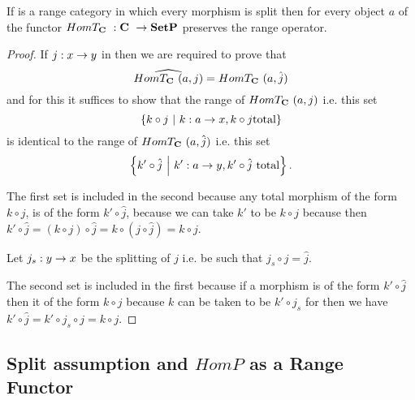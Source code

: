 \documentclass[10pt,a4paper]{article}
\theoremstyle{remark}
\begin{document}
\begin{lemma}
If \catcw is a range category in which every morphism is split then
for every object $a$ of \catcw the functor $HomT_{\textbf{C}}\ : \textbf{C}\  \rightarrow \textbf{SetP}$ preserves the range operator.
\end{lemma}
\begin{proof}
If $j: x \rightarrow y$ in \catcw then we are required to prove that
$$\widehat{HomT_{\textbf{C}}\ (a,j)}=HomT_{\textbf{C}}\ (a,\hat{j})$$
and for this it suffices to show that the range of $HomT_{\textbf{C}}\ (a,j)$ i.e. this set
$$\left\{ k \circ j \ \middle|\ k: a \rightarrow x, k \circ j \mbox{total}\right\}$$ 
is identical to the range of $HomT_{\textbf{C}}\ (a,\hat{j})$ i.e. this set
$$\left\{k' \circ \hat{j} \ \middle|\ k':a \rightarrow y,  k' \circ \hat{j} \mbox{ total}\right\}.$$  

The first set is included in the second because any total morphism of the form $k \circ j$,  is of the form $k' \circ \hat{j}$,  because we can take $k'$ to be $k \circ j$ 
because then $k' \circ \hat{j} = (k \circ j) \circ \hat{j}= k \circ(j \circ \hat{j})= k \circ j$. 

Let $j_s : y \rightarrow x$ be the splitting of $j$ i.e. be such that $j_s \circ j = \hat{j}$.

The second set is included in the first because if a morphism is of the form $k' \circ \hat{j}$ then it of the form $k \circ j$ because $k$ can be taken to be $k' \circ j_s$ for then we have $k' \circ \hat{j} = k' \circ j_s \circ j = k \circ j$. 
 \end{proof}

 \subsection{Split assumption and $HomP$ as a Range Functor}
\end{document}
